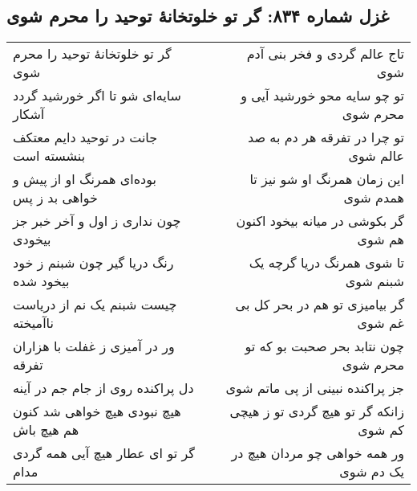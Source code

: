 \begin{center}
\section*{غزل شماره ۸۳۴: گر تو خلوتخانهٔ توحید را محرم شوی}
\label{sec:834}
\begin{longtable}{l p{0.5cm} r}
گر تو خلوتخانهٔ توحید را محرم شوی
&&
تاج عالم گردی و فخر بنی آدم شوی
\\
سایه‌ای شو تا اگر خورشید گردد آشکار
&&
تو چو سایه محو خورشید آیی و محرم شوی
\\
جانت در توحید دایم معتکف بنشسته است
&&
تو چرا در تفرقه هر دم به صد عالم شوی
\\
بوده‌ای همرنگ او از پیش و خواهی بد ز پس
&&
این زمان همرنگ او شو نیز تا همدم شوی
\\
چون نداری ز اول و آخر خبر جز بیخودی
&&
گر بکوشی در میانه بیخود اکنون هم شوی
\\
رنگ دریا گیر چون شبنم ز خود بیخود شده
&&
تا شوی همرنگ دریا گرچه یک شبنم شوی
\\
چیست شبنم یک نم از دریاست ناآمیخته
&&
گر بیامیزی تو هم در بحر کل بی غم شوی
\\
ور در آمیزی ز غفلت با هزاران تفرقه
&&
چون نتابد بحر صحبت بو که تو محرم شوی
\\
دل پراکنده روی از جام جم در آینه
&&
جز پراکنده نبینی از پی ماتم شوی
\\
هیچ نبودی هیچ خواهی شد کنون هم هیچ باش
&&
زانکه گر تو هیچ گردی تو ز هیچی کم شوی
\\
گر تو ای عطار هیچ آیی همه گردی مدام
&&
ور همه خواهی چو مردان هیچ در یک دم شوی
\\
\end{longtable}
\end{center}
